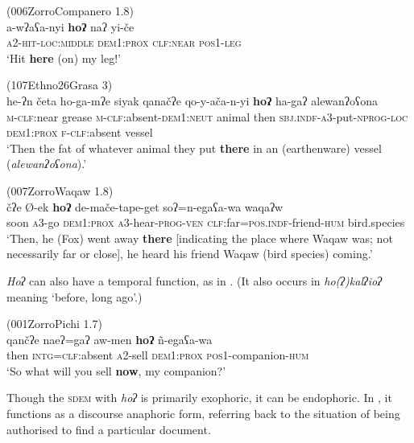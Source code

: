 \documentclass[output=paper,colorlinks,citecolor=brown]{langscibook}
\begin{document}
\ea\label{ex:payne:19} (006ZorroCompanero 1.8)\\
\gll  a-wʔaʕa-nyi  \textbf{hoʔ}  naʔ  yi-če\\
\textsc{a2-hit-loc:middle}  \textsc{dem1:prox}  \textsc{clf:near}  \textsc{pos1-leg}\\
\glt ‘Hit \textbf{here} (on) my leg!’ 
\z

\ea\label{ex:payne:20} (107Ethno26Grasa 3)\\
\gll  he-ʔn  četa  ho-ga-mʔe  siyak  qanačʔe qo-y-ača-n-yi    \textbf{hoʔ}  ha-gaʔ  alewanʔoʕona\\
\textsc{m-clf}:near grease  \textsc{m-clf}:absent-\textsc{dem1:neut}  animal then \textsc{sbj.indf-a3}-put-\textsc{nprog-loc}  \textsc{dem1:prox}  \textsc{f-clf}:absent vessel\\
\glt ‘Then the fat of whatever animal they put \textbf{there} in an (earthenware) vessel (\textit{alewanʔoʕona}).’ 
\z

\ea\label{ex:payne:21} (007ZorroWaqaw 1.8)\\
\gll  čʔe  Ø-ek  \textbf{hoʔ}  de-mače-tape-get soʔ=n-egaʕa-wa  waqaʔw\\
 soon \textsc{a3}-go \textsc{dem1:prox}  \textsc{a3}-hear-\textsc{prog-ven} \textsc{clf}:far=\textsc{pos.indf}-friend-\textsc{hum} bird.species\\
\glt ‘Then, he (Fox) went away \textbf{there} [indicating the place where Waqaw was; not necessarily far or close], he heard his friend Waqaw (bird species) coming.’ 
\z

\textit{Hoʔ} can also have a temporal function, as in . (It also occurs in \textit{ho(ʔ)kalʔioʔ} meaning ‘before, long ago’.)

\ea\label{ex:payne:22} (001ZorroPichi 1.7)\\
\gll qančʔe  naeʔ=gaʔ  aw-men  \textbf{hoʔ}  ñ-egaʕa-wa\\
then  \textsc{intg=clf}:absent \textsc{a2}-sell  \textsc{dem1:prox}  \textsc{pos1}-companion-\textsc{hum}\\
\glt ‘So what will you sell \textbf{now}, my companion?’ 
\z

Though the \textsc{sdem} with \textit{hoʔ} is primarily exophoric, it can be endophoric. In , it functions as a discourse anaphoric form, referring back to the situation of being authorised to find a particular document.
\end{document}
